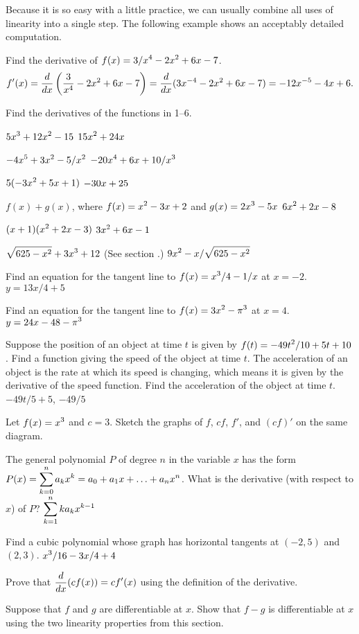 Because it is so easy with a little practice, we can usually combine
all uses of linearity into a single step. The following example shows
an acceptably detailed computation.

\example
Find the derivative of $\displaystyle f(x)=3/x^4-2x^2+6x-7$.
$$f'(x) = {d\over dx}\left( {3\over x^4}-2x^2+6x-7\right)
= {d\over dx}(3x^{-4}-2x^2+6x-7) 
= -12x^{-5}-4x+6.$$
\vskip-10pt\endexample

\exercises

Find the derivatives of the functions in 1--6.

\exercise $\displaystyle 5x^3+12x^2-15$
\answer $\displaystyle 15x^2+24x$
\endanswer
\endexercise

\exercise $\displaystyle -4x^5 + 3x^2 - 5/x^2$
\answer $\displaystyle -20x^4+6x+10/x^3$
\endanswer
\endexercise

\exercise $\displaystyle 5(-3x^2 + 5x + 1)$
\answer $\displaystyle -30x+25$
\endanswer
\endexercise

\exercise $f(x)+g(x)$, where $\displaystyle f(x)=x^2-3x+2$ and $\displaystyle g(x)=2x^3-5x$
\answer $\displaystyle 6x^2+2x-8$
\endanswer
\endexercise

\exercise $\displaystyle (x+1)(x^2+2x-3)$
\answer $\displaystyle 3x^2+6x-1$
\endanswer
\endexercise

\exercise $\displaystyle \sqrt{625-x^2}+3x^3+12$ (See section .)
\answer $\displaystyle 9x^2-x/\sqrt{625-x^2}$
\endanswer
\endexercise

\exercise
 Find an equation for the tangent line to $\displaystyle f(x) = x^3/4 - 1/x$ at $x=-2$.
\answer $y=13x/4+5$
\endanswer
\endexercise

\exercise Find an equation for 
the tangent line to $\displaystyle f(x)= 3x^2 - \pi ^3$ at $x= 4$.
\answer $\displaystyle y=24x-48-\pi^3$
\endanswer
\endexercise

\exercise Suppose the position of an object at time $t$ is  given by
$\displaystyle f(t)=-49 t^2/10+5t+10$. Find a function giving the speed of the object
at time $t$. The acceleration of an object is the rate at which its
speed is changing, which means it is given by the derivative of the
speed function. Find the acceleration of the object at time $t$.
\answer $-49t/5+5$, $-49/5$
\endanswer
\endexercise

\exercise Let $\displaystyle f(x) =x^3$ and $c= 3$. Sketch the graphs of $f$,
$cf$, $f'$, and $(cf)'$ on the same diagram.
\endexercise

\exercise The general polynomial $P$ of degree $n$ in the variable $x$
has the form $\displaystyle P(x)= \sum _{k=0 } ^n a_k x^k = a_0 + a_1 x + \ldots
+ a_n x^n$. What is the derivative (with respect to $x$)
of $P$?
\answer $\displaystyle\sum_{k=1}^n ka_kx^{k-1}$
\endanswer
\endexercise

\exercise Find a cubic polynomial whose graph has horizontal tangents at
$(-2 , 5)$ and $(2, 3)$.
\answer $\displaystyle x^3/16-3x/4+4$
\endanswer
\endexercise

\exercise Prove that $\displaystyle{d\over dx}(cf(x))= cf'(x)$ using the
definition of the derivative.
\endexercise

\exercise Suppose that $f$ and $g$ are differentiable at $x$. Show
that $f-g$ is differentiable at $x$ using the two linearity
properties from this section.
\endexercise

\endexercises

